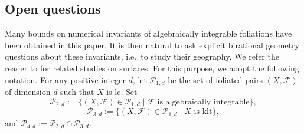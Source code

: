 \documentclass[11pt,reqno]{amsart}
\numberwithin{equation}{section}
\newcommand{\Ff}{\mathcal{F}}
\theoremstyle{definition}
\begin{document}
\subsection{Open questions}

Many bounds on numerical invariants of algebraically integrable foliations have been obtained in this paper. It is then natural to ask explicit birational geometry questions about these invariants, i.e.\ to study their geography. We refer the reader to \cite{SS23,LWX25,Vas25,Xu25b} for related studies on surfaces. For this purpose, we adopt the following notation. For any positive integer $d$, let $\mathcal{P}_{1,d}$ be the set of foliated pairs $(X,\Ff)$ of dimension $d$ such that $X$ is lc. Set
$$\mathcal{P}_{2,d}:=\{(X,\Ff)\in \mathcal{P}_{1,d}\mid \Ff\text{ is algebraically integrable}\},$$
$$\mathcal{P}_{3,d}:=\{(X,\Ff)\in \mathcal{P}_{1,d}\mid X\text{ is klt}\},$$
and $\mathcal{P}_{4,d}:=\mathcal{P}_{2,d}\cap\mathcal{P}_{3,d}$.
\end{document}
